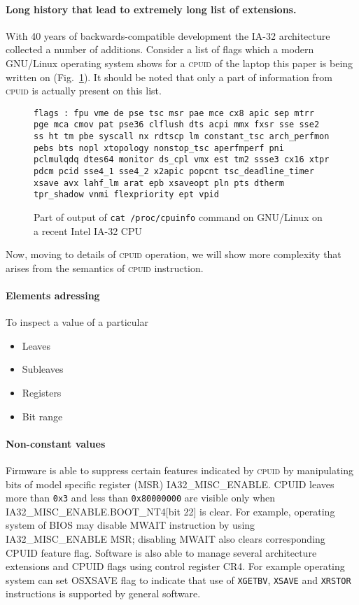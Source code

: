 \documentclass[a4paper,10pt,oneside,unicode]{article}
\newcommand{\cpuid}{\textsc{cpuid} }
\begin{document}
\paragraph{Long history that lead to extremely long list of extensions.} With 40 years of backwards-compatible development the IA-32 architecture collected a number of additions. Consider a list of flags which a modern GNU/Linux operating system shows for a \cpuid of the laptop this paper is being written on (Fig.~\ref{fig:flags}). It should be noted that only a part of information from \cpuid is actually present on this list.

\begin{figure}
\noindent\texttt{flags           : fpu vme de pse tsc msr pae mce cx8 apic sep mtrr pge mca cmov pat pse36 clflush dts acpi mmx fxsr sse sse2 ss ht tm pbe syscall nx rdtscp lm constant\_tsc arch\_perfmon pebs bts nopl xtopology nonstop\_tsc aperfmperf pni pclmulqdq dtes64 monitor ds\_cpl vmx est tm2 ssse3 cx16 xtpr pdcm pcid sse4\_1 sse4\_2 x2apic popcnt tsc\_deadline\_timer xsave avx lahf\_lm arat epb xsaveopt pln pts dtherm tpr\_shadow vnmi flexpriority ept vpid
}
\caption{Part of output of \texttt{cat /proc/cpuinfo} command on GNU/Linux on a recent Intel IA-32 {CPU}}\label{fig:flags}
\end{figure} 

Now, moving to details of \cpuid operation, we will show more complexity that arises from the semantics of \cpuid instruction.

\paragraph{Elements adressing}

To inspect a value of a particular
\begin{itemize}
\item Leaves
\item Subleaves
\item Registers
\item Bit range
\end{itemize}

\paragraph{Non-constant values} Firmware is able to suppress certain features indicated by \cpuid by manipulating bits of model specific register (MSR) IA32\_MISC\_ENABLE. CPUID leaves more than \texttt{0x3} and less than \texttt{0x80000000} are visible only when IA32\_MISC\_ENABLE.BOOT\_NT4[bit 22] is clear. For example, operating system of BIOS may disable MWAIT instruction by using IA32\_MISC\_ENABLE MSR; disabling MWAIT also clears corresponding CPUID feature flag. Software is also able to manage several architecture extensions and CPUID flags using control register CR4. For example operating system can set OSXSAVE flag to indicate that use of \texttt{XGETBV}, \texttt{XSAVE} and \texttt{XRSTOR} instructions is supported by general software.
\end{document}
